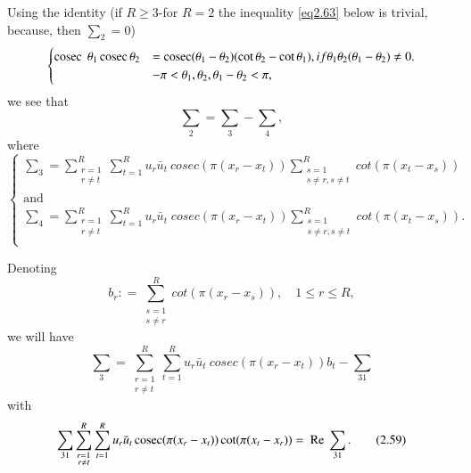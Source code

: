 Using the identity (if $R \geq 3$-for $R = 2$ the inequality \eqref{eq2.63}
below is trivial, because, then $\sum_2 =0$) 
{\fontsize{10}{12}\selectfont
\begin{equation*}
\begin{cases}
\operatorname{cosec} \; \theta_1 \operatorname{cosec} \theta _2 &= \operatorname{cosec} (\theta _1-\theta _2)(\cot \theta _2- \cot \theta _1), if \theta _1 \theta _2 (\theta _1-\theta _2)\neq 0.\\
& -\pi < \theta _1,\theta _2,\theta _1-\theta _2 < \pi,
\end{cases}
\end{equation*}}
we see that 
\begin{equation*}
\sum_2 = \sum_3 - \sum_4, \tag{2.55}\label{eq2.55}
\end{equation*}
where
\begin{equation*}
\begin{cases}
\sum_3 =\sum\limits_{\substack{r=1 \\ r \neq t}}^{R} \sum\limits_{t=1}^{R} u_r
\bar{u}_t ~ cosec (\pi(x_r -x_t )) \sum\limits_{\substack{s=1 \\ s \neq r, s
    \neq t}}^{R} cot (\pi (x_t- x_s))\\ 
\text{and} &\\
\sum_4 =\sum\limits_{\substack{r=1 \\ r \neq t}}^{R}
\sum\limits_{t=1}^{R} u_r \bar{u}_t\; cosec (\pi (x_r -x_t ))
\sum\limits_{\substack{s=1 \\ s \neq r, s \neq t}}^{R} cot (\pi (x_t-
x_s)).\\ 
\end{cases} \tag{2.56}\label{eq2.56}
\end{equation*}

Denoting\pageoriginale
\begin{equation*}
b_r : = \sum_{\substack{s=1 \\ s \neq r}}^{R} cot (\pi (x_r -x_s )),
\quad 1 \le r \le R, \tag{2.57}\label{eq2.57} 
\end{equation*}
we will have
\begin{equation*}
\sum_{3}= \sum_{\substack{r=1 \\ r \neq t}}^{R} \sum_{t=1}^{R} u_r \bar{u}_t ~ cosec (\pi(x_r -x_t )) b_t - \sum_ {31} \tag{2.58}\label{eq2.58}
\end{equation*}
with
\begin{equation*}
\sum_ {31}\sum_{\substack{r=1 \\ r \neq t}}^{R} \sum_{t=1}^{R} u_r
\bar{u}_t \operatorname{cosec} (\pi(x_r -x_t )) \cot (\pi (x_t -x_r)) = \text{ Re } 
\sum_{31}. \tag{2.59}\label{eq2.59} 
\end{equation*}

